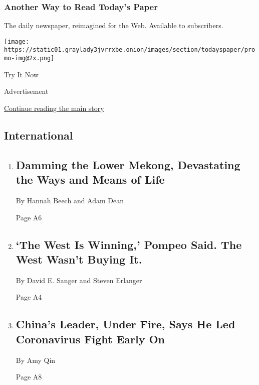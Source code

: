 \href{http://app.nytimes3xbfgragh.onion/todayspaper}{}

\hypertarget{another-way-to-read-todays-paper}{%
\subsubsection{Another Way to Read Today's
Paper}\label{another-way-to-read-todays-paper}}

The daily newspaper, reimagined for the Web. Available to subscribers.

\texttt{[image: https://static01.graylady3jvrrxbe.onion/images/section/todayspaper/promo-img@2x.png]}

Try It Now

Advertisement

\protect\hyperlink{after-mid1}{Continue reading the main story}

\hypertarget{international}{%
\subsection{International}\label{international}}

\begin{enumerate}
\def\labelenumi{\arabic{enumi}.}
\item
  \href{/2020/02/15/world/asia/mekong-river-dams-thailand.html}{}

  \hypertarget{damming-the-lower-mekong-devastating-the-ways-and-means-of-life-1}{%
  \subsection{Damming the Lower Mekong, Devastating the Ways and Means
  of
  Life}\label{damming-the-lower-mekong-devastating-the-ways-and-means-of-life-1}}

  By Hannah Beech and Adam Dean

  Page A6
\item
  \href{/2020/02/15/world/europe/pompeo-munich-conference.html}{}

  \hypertarget{the-west-is-winning-pompeo-said-the-west-wasnt-buying-it}{%
  \subsection{`The West Is Winning,' Pompeo Said. The West Wasn't Buying
  It.}\label{the-west-is-winning-pompeo-said-the-west-wasnt-buying-it}}

  By David E. Sanger and Steven Erlanger

  Page A4
\item
  \href{/2020/02/15/world/asia/xi-china-coronavirus.html}{}

  \hypertarget{chinas-leader-under-fire-says-he-led-coronavirus-fight-early-on-1}{%
  \subsection{China's Leader, Under Fire, Says He Led Coronavirus Fight
  Early
  On}\label{chinas-leader-under-fire-says-he-led-coronavirus-fight-early-on-1}}

  By Amy Qin

  Page A8
\end{enumerate}

